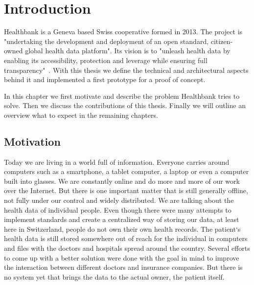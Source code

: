 	
\newcommand{\package}{\emph} 
 
\chapter{Introduction} 

Healthbank is a Geneva based Swiss cooperative formed in 2013. The project is "undertaking the development and deployment of an open standard, citizen-owned global health data platform". Its vision is to "unleash health data by enabling its accessibility, protection and leverage while ensuring full transparency"~\cite{healthbank}. With this thesis we define the technical and architectural aspects behind it and implemented a first prototype for a proof of concept.

In this chapter we first motivate and describe the problem Healthbank tries to solve. Then we discuss the contributions of this thesis. Finally we will outline an overview what to expect in the remaining chapters.


\section{Motivation}

Today we are living in a world full of information. Everyone carries around computers such as a smartphone, a tablet computer, a laptop or even a computer built into glasses. We are constantly online and do more and more of our work over the Internet. But there is one important matter that is still generally offline, not fully under our control and widely distributed. We are talking about the health data of individual people. Even though there were many attempts to implement standards and create a centralized way of storing our data, at least here in Switzerland, people do not own their own health records. The patient`s health data is still stored somewhere out of reach for the individual in computers and files with the doctors and hospitals spread around the country. Several efforts to come up with a better solution were done with the goal in mind to improve the interaction between different doctors and insurance companies. But there is no system yet that brings the data to the actual owner, the patient itself. 

